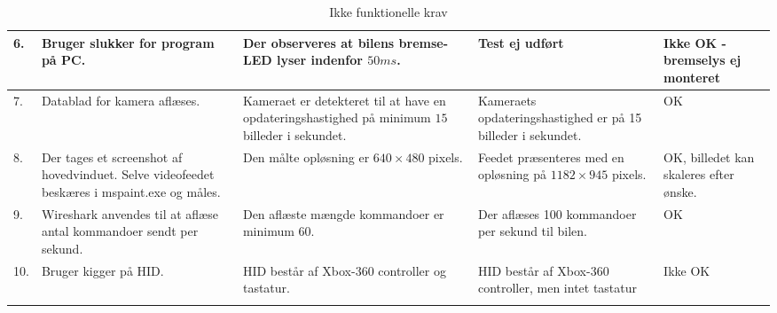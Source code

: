 \begin{longtable}{| l | L{4cm} | Z | Z | L{3 cm} |}
    6. 	& Bruger slukker for program på PC.
    	& Der observeres at bilens bremse-LED lyser indenfor $50 ms$.
    	& Test ej udført
    	& Ikke OK - bremselys ej monteret\\ \hline
    
	7. 	& Datablad for kamera aflæses.
		& Kameraet er detekteret til at have en opdateringshastighed på minimum $15$ billeder i sekundet.
		& Kameraets opdateringshastighed er på 15 billeder i sekundet.
		& OK\\ \hline
       
    8. 	& Der tages et screenshot af hovedvinduet. Selve videofeedet beskæres i mspaint.exe og måles.
    	& Den målte opløsning er $640 \times 480$ pixels.
    	& Feedet præsenteres med en opløsning på $1182 \times 945$ pixels.
    	& OK, billedet kan skaleres efter ønske.\\ \hline
    
    9. 	& Wireshark anvendes til at aflæse antal kommandoer sendt per sekund.
    	& Den aflæste mængde kommandoer er minimum $60$.
    	& Der aflæses 100 kommandoer per sekund til bilen.
    	& OK\\ \hline
    	
    10.	& Bruger kigger på HID.
    	& HID består af Xbox-360 controller og tastatur.
    	& HID består af Xbox-360 controller, men intet tastatur
    	& Ikke OK\\ \hline 
    
\caption{Ikke funktionelle krav}
\label{tbl:ikkefunk}
\end{longtable}
